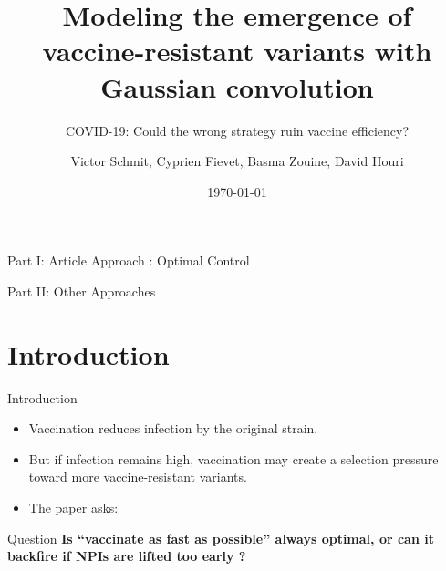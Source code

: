 \documentclass[
11pt,notheorems,hyperref={pdfauthor=whatever}
]{beamer}
\title[
Vaccination vs NPI]{Modeling the emergence of vaccine-resistant variants with Gaussian convolution}
\subtitle{COVID-19: Could the wrong strategy ruin vaccine efficiency?}
\author[
]{
Victor Schmit, 
Cyprien Fievet,
Basma Zouine,
David Houri
}
\institute{CentraleSupélec}
\date{\today}
\begin{document}
{
\begin{frame}
	\titlepage
\end{frame}
}
\addtocounter{framenumber}{-1}

\begin{frame}{Part I: Article Approach : Optimal Control}
	\tableofcontents[part=1]
\end{frame}

\begin{frame}{Part II: Other Approaches}
	\tableofcontents[part=2]
\end{frame}


\section{Introduction}

\begin{frame}{Introduction}
	\begin{itemize}
		\item Vaccination reduces infection by the original strain.

		      \medskip

		\item But if infection remains high, vaccination may create a \alert{selection pressure}
		      toward more vaccine-resistant variants.

		      \medskip

		\item The paper asks:
	\end{itemize}

	\medskip

	\begin{block}{Question}
		\textbf{Is ``vaccinate as fast as possible'' always optimal, or can it backfire if NPIs are lifted too early ?}
	\end{block}
\end{frame}

%
%
%
%
%
%
%
%
\end{document}
